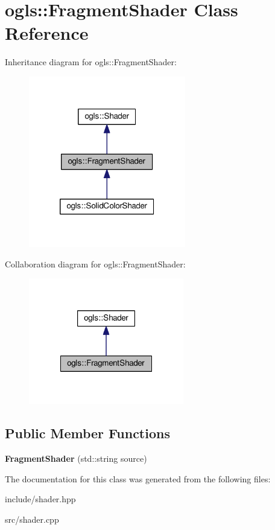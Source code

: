 \hypertarget{classogls_1_1FragmentShader}{\section{ogls\-:\-:Fragment\-Shader Class Reference}
\label{classogls_1_1FragmentShader}
}


Inheritance diagram for ogls\-:\-:Fragment\-Shader\-:
\nopagebreak
\begin{figure}[H]
\begin{center}
\leavevmode
\includegraphics[width=194pt]{d1/d60/classogls_1_1FragmentShader__inherit__graph}
\end{center}
\end{figure}


Collaboration diagram for ogls\-:\-:Fragment\-Shader\-:
\nopagebreak
\begin{figure}[H]
\begin{center}
\leavevmode
\includegraphics[width=192pt]{d9/d73/classogls_1_1FragmentShader__coll__graph}
\end{center}
\end{figure}
\subsection*{Public Member Functions}
\begin{DoxyCompactItemize}
\item 
\hypertarget{classogls_1_1FragmentShader_aeb28087000e1456f5d31e5857f134644}{{\bfseries Fragment\-Shader} (std\-::string source)}\label{classogls_1_1FragmentShader_aeb28087000e1456f5d31e5857f134644}

\end{DoxyCompactItemize}


The documentation for this class was generated from the following files\-:\begin{DoxyCompactItemize}
\item 
include/shader.\-hpp\item 
src/shader.\-cpp\end{DoxyCompactItemize}
